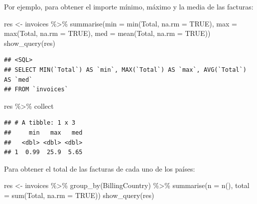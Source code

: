 \documentclass[
]{book}
\newenvironment{Shaded}{\begin{snugshade}}{\end{snugshade}}
\newcommand{\AttributeTok}[1]{\textcolor[rgb]{0.77,0.63,0.00}{#1}}
\newcommand{\ConstantTok}[1]{\textcolor[rgb]{0.00,0.00,0.00}{#1}}
\newcommand{\FunctionTok}[1]{\textcolor[rgb]{0.00,0.00,0.00}{#1}}
\newcommand{\NormalTok}[1]{#1}
\newcommand{\OtherTok}[1]{\textcolor[rgb]{0.56,0.35,0.01}{#1}}
\newcommand{\SpecialCharTok}[1]{\textcolor[rgb]{0.00,0.00,0.00}{#1}}
\theoremstyle{break}
\theoremstyle{nonumberplain}
\begin{document}
Por ejemplo, para obtener el importe mínimo, máximo y la media de las facturas:

\begin{Shaded}
\begin{Highlighting}[]
\NormalTok{res }\OtherTok{\textless{}{-}}\NormalTok{ invoices }\SpecialCharTok{\%\textgreater{}\%} \FunctionTok{summarise}\NormalTok{(}\AttributeTok{min =} \FunctionTok{min}\NormalTok{(Total, }\AttributeTok{na.rm =} \ConstantTok{TRUE}\NormalTok{), }
                        \AttributeTok{max =} \FunctionTok{max}\NormalTok{(Total, }\AttributeTok{na.rm =} \ConstantTok{TRUE}\NormalTok{), }\AttributeTok{med =} \FunctionTok{mean}\NormalTok{(Total, }\AttributeTok{na.rm =} \ConstantTok{TRUE}\NormalTok{))}
\FunctionTok{show\_query}\NormalTok{(res)}
\end{Highlighting}
\end{Shaded}

\begin{verbatim}
## <SQL>
## SELECT MIN(`Total`) AS `min`, MAX(`Total`) AS `max`, AVG(`Total`) AS `med`
## FROM `invoices`
\end{verbatim}

\begin{Shaded}
\begin{Highlighting}[]
\NormalTok{res  }\SpecialCharTok{\%\textgreater{}\%}\NormalTok{ collect}
\end{Highlighting}
\end{Shaded}

\begin{verbatim}
## # A tibble: 1 x 3
##     min   max   med
##   <dbl> <dbl> <dbl>
## 1  0.99  25.9  5.65
\end{verbatim}

Para obtener el total de las facturas de cada uno de los países:

\begin{Shaded}
\begin{Highlighting}[]
\NormalTok{res }\OtherTok{\textless{}{-}}\NormalTok{ invoices }\SpecialCharTok{\%\textgreater{}\%} \FunctionTok{group\_by}\NormalTok{(BillingCountry) }\SpecialCharTok{\%\textgreater{}\%} 
          \FunctionTok{summarise}\NormalTok{(}\AttributeTok{n =} \FunctionTok{n}\NormalTok{(), }\AttributeTok{total =} \FunctionTok{sum}\NormalTok{(Total, }\AttributeTok{na.rm =} \ConstantTok{TRUE}\NormalTok{))}
\FunctionTok{show\_query}\NormalTok{(res)}
\end{Highlighting}
\end{Shaded}
\end{document}
